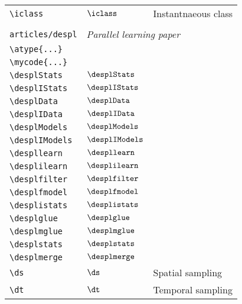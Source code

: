 \begin{longtable}{lll}
 {\color[rgb]{0.5,0.5,0.5}\texttt{\textbackslash iclass}} & $\iclass$ &  Instantnaeous class\\ 
  &  & \\ 
 {\color[rgb]{0.5,0.5,0.5}\texttt{articles/despl}} & \multicolumn{2}{l}{\emph{Parallel learning paper}}\\ 
 \hline
{\color[rgb]{0.5,0.5,0.5}\texttt{\textbackslash atype\{...\}}} &  & \\ 
 {\color[rgb]{0.5,0.5,0.5}\texttt{\textbackslash mycode\{...\}}} &  & \\ 
 {\color[rgb]{0.5,0.5,0.5}\texttt{\textbackslash desplStats}} & $\desplStats$ & \\ 
 {\color[rgb]{0.5,0.5,0.5}\texttt{\textbackslash desplIStats}} & $\desplIStats$ & \\ 
 {\color[rgb]{0.5,0.5,0.5}\texttt{\textbackslash desplData}} & $\desplData$ & \\ 
 {\color[rgb]{0.5,0.5,0.5}\texttt{\textbackslash desplIData}} & $\desplIData$ & \\ 
 {\color[rgb]{0.5,0.5,0.5}\texttt{\textbackslash desplModels}} & $\desplModels$ & \\ 
 {\color[rgb]{0.5,0.5,0.5}\texttt{\textbackslash desplIModels}} & $\desplIModels$ & \\ 
 {\color[rgb]{0.5,0.5,0.5}\texttt{\textbackslash despllearn}} & $\despllearn$ & \\ 
 {\color[rgb]{0.5,0.5,0.5}\texttt{\textbackslash desplilearn}} & $\desplilearn$ & \\ 
 {\color[rgb]{0.5,0.5,0.5}\texttt{\textbackslash desplfilter}} & $\desplfilter$ & \\ 
 {\color[rgb]{0.5,0.5,0.5}\texttt{\textbackslash desplfmodel}} & $\desplfmodel$ & \\ 
 {\color[rgb]{0.5,0.5,0.5}\texttt{\textbackslash desplistats}} & $\desplistats$ & \\ 
 {\color[rgb]{0.5,0.5,0.5}\texttt{\textbackslash desplglue}} & $\desplglue$ & \\ 
 {\color[rgb]{0.5,0.5,0.5}\texttt{\textbackslash desplmglue}} & $\desplmglue$ & \\ 
 {\color[rgb]{0.5,0.5,0.5}\texttt{\textbackslash desplstats}} & $\desplstats$ & \\ 
 {\color[rgb]{0.5,0.5,0.5}\texttt{\textbackslash desplmerge}} & $\desplmerge$ & \\ 
 {\color[rgb]{0.5,0.5,0.5}\texttt{\textbackslash ds}} & $\ds$ &  Spatial sampling\\ 
 {\color[rgb]{0.5,0.5,0.5}\texttt{\textbackslash dt}} & $\dt$ &  Temporal sampling\\ 

\end{longtable}
